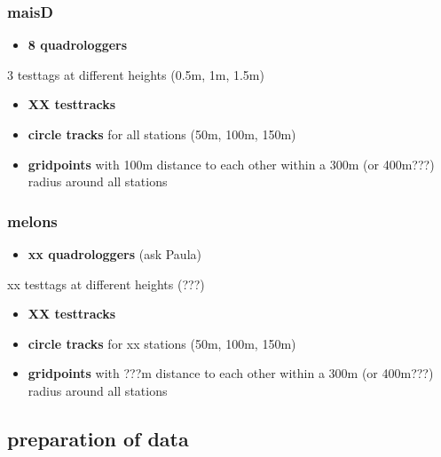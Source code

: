 \documentclass[
]{article}
\providecommand{\tightlist}{%
  \setlength{\itemsep}{0pt}\setlength{\parskip}{0pt}}\usepackage{longtable,booktabs,array}
\begin{document}
\hypertarget{maisd}{%
\subsubsection{maisD}\label{maisd}}

\begin{itemize}
\tightlist
\item
  \textbf{8 quadrologgers}
\end{itemize}

3 testtags at different heights (0.5m, 1m, 1.5m)

\begin{itemize}
\tightlist
\item
  \textbf{XX testtracks}\\
\item
  \textbf{circle tracks} for all stations (50m, 100m, 150m)\\
\item
  \textbf{gridpoints} with 100m distance to each other within a 300m (or
  400m???) radius around all stations
\end{itemize}

\hypertarget{melons}{%
\subsubsection{melons}\label{melons}}

\begin{itemize}
\tightlist
\item
  \textbf{xx quadrologgers} (ask Paula)
\end{itemize}

xx testtags at different heights (???)

\begin{itemize}
\tightlist
\item
  \textbf{XX testtracks}\\
\item
  \textbf{circle tracks} for xx stations (50m, 100m, 150m)\\
\item
  \textbf{gridpoints} with ???m distance to each other within a 300m (or
  400m???) radius around all stations
\end{itemize}

\hypertarget{preparation-of-data}{%
\subsection{preparation of data}\label{preparation-of-data}}
\end{document}
